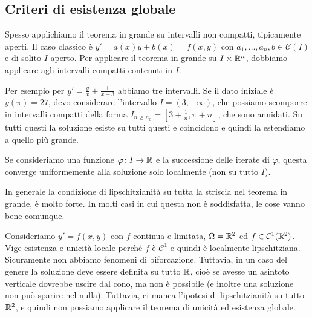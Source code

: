 \documentclass[a4paper]{article}
\begin{document}
\subsection{Criteri di esistenza globale}

\begin{radioactive}
Spesso applichiamo il teorema in grande su intervalli non compatti, tipicamente aperti.
Il caso classico è \(y' = a(x)y + b(x) = f(x,y)\) con \(a_1,\ldots,a_n,b \in \mathcal C(I)\)
e di solito \(I\) aperto.
Per applicare il teorema in grande su \(I \times \mathbb{R}^n\),
dobbiamo applicare agli intervalli compatti contenuti in \(I\).

Per esempio per \(y' = \frac yx + \frac 1{x-3}\)
abbiamo tre intervalli. Se il dato iniziale è \(y(\pi) = 27\), devo considerare l'intervallo
\(I = (3, +\infty)\), che possiamo scomporre in intervalli compatti della forma \(I_{n \geq n_0} = \left[3 + \frac 1n, \pi + n\right]\),
che sono annidati. Su tutti questi
la soluzione esiste su tutti questi e coincidono e quindi la estendiamo a quello più grande.

Se consideriamo una funzione \(\varphi \colon I \to \mathbb{R}\) e la successione delle iterate
di \(\varphi\), questa converge uniformemente alla soluzione solo localmente (non su tutto \(I\)).

In generale la condizione di lipschitzianità su tutta la striscia nel teorema in grande,
è molto forte. In molti casi in cui questa non è soddisfatta, le cose vanno bene comunque.
\end{radioactive}

\begin{radioactive}
\begin{snippetexample}{}
    Consideriamo
    \(y' = f(x,y)\) con \(f\) continua e limitata, \(\Omega = \mathbb{R}^2\) ed
    \(f \in \mathcal C^1(\mathbb{R}^2)\).
    Vige esistenza e unicità locale perché \(f\)
    è \(\mathcal C^1\) e quindi è localmente lipschitziana.
    Sicuramente non abbiamo fenomeni di biforcazione.
    Tuttavia, in un caso del genere la soluzione deve essere definita su tutto \(\mathbb{R}\),
    cioè se avesse un asintoto verticale dovrebbe uscire dal cono, ma non è possibile (e inoltre una soluzione non può sparire nel nulla).
    Tuttavia, ci manca l'ipotesi di lipschitzianità su tutto \(\mathbb{R}^2\),
    e quindi non possiamo applicare il teorema di unicità ed esistenza globale.
\end{snippetexample}
\end{radioactive}
\end{document}
